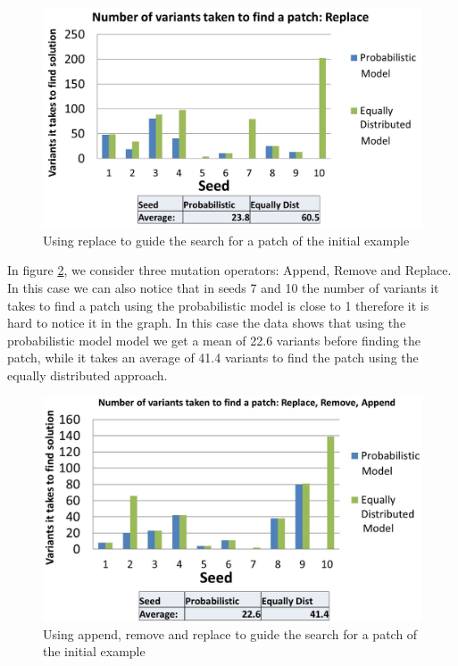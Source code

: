 \documentclass[conference]{IEEEtran}
\begin{document}
\begin{figure}[!h]
  \centering
    \includegraphics[scale=0.25]{sanity3}
  \caption{Using replace to guide the search for a patch of the initial example}
  \label{fig:resultsReplace}
\end{figure}

In figure \ref{fig:resultsARR}, we consider three mutation operators: Append, 
Remove and Replace. In this case we can also notice that in seeds 7 and 10 the 
number of variants it takes to find a patch using the probabilistic model is 
close to 1 therefore it is hard to notice it in the graph. In this case the data 
shows that using the probabilistic model model we get a mean of 22.6 variants 
before finding the patch, while it takes an average of 41.4 variants to find the 
patch using the equally distributed approach.

\begin{figure}[!h]
  \centering
    \includegraphics[scale=0.25]{sanity4}
  \caption{Using append, remove and replace to guide the search for a patch of 
the initial example}
  \label{fig:resultsARR}
\end{figure}
\end{document}

